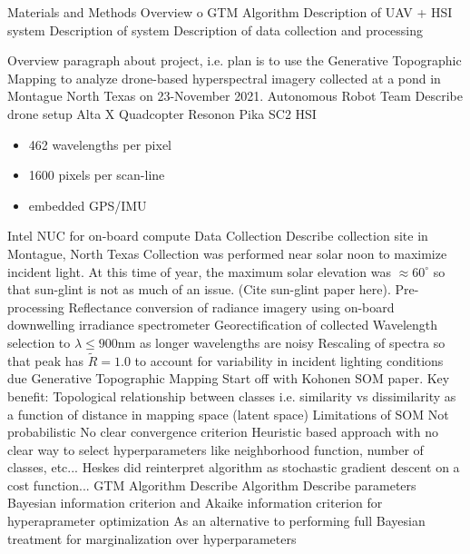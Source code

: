 \documentclass{article}
\begin{document}
\begin{outline}[enumerate]
\1 Materials and Methods
    \2 Overview o GTM Algorithm
    \2 Description of UAV + HSI system 
        \3 Description of system 
        \3 Description of data collection and processing
        \3 

    \2 Overview paragraph about project, i.e. plan is to use the Generative Topographic Mapping to analyze drone-based hyperspectral imagery collected at a pond in Montague North Texas on 23-November 2021. 
   \2 Autonomous Robot Team
        \3 Describe drone setup
            \4 Alta X Quadcopter
            \4 Resonon Pika SC2 HSI
                \begin{itemize}
                    \item 462 wavelengths per pixel
                    \item 1600 pixels per scan-line
                    \item embedded GPS/IMU
               \end{itemize}
             \4 Intel NUC for on-board compute
   \2 Data Collection
        \3 Describe collection site in Montague, North Texas
        \3 Collection was performed near solar noon to maximize incident light. At this time of year, the maximum solar elevation was $\approx 60^\circ$ so that sun-glint is not as much of an issue. (Cite sun-glint paper here).
    \2 Pre-processing
        \3 Reflectance conversion of radiance imagery using on-board downwelling irradiance spectrometer
        \3 Georectification of collected
        \3 Wavelength selection to $\lambda \leq 900 \text{nm}$ as longer wavelengths are noisy
        \3 Rescaling of spectra so that peak has $\tilde{R}  = 1.0$  to account for variability in incident lighting conditions due 
    \2 Generative Topographic Mapping
        \3 Start off with Kohonen SOM paper. Key benefit:
            \4 Topological relationship between classes i.e. similarity vs dissimilarity as a function of distance in mapping space (latent space)
        \3 Limitations of SOM
            \4 Not probabilistic
            \4 No clear convergence criterion
            \4 Heuristic based approach with no clear way to select hyperparameters like neighborhood function, number of classes, etc...
            \4 Heskes did reinterpret algorithm as stochastic gradient descent on a cost function...
        \3 GTM Algorithm
            \4 Describe Algorithm
            \4 Describe parameters
        \3 Bayesian information criterion and Akaike information criterion for hyperaprameter optimization
            \4 As an alternative to performing full Bayesian treatment for marginalization over hyperparameters

\end{outline}
\end{document}
